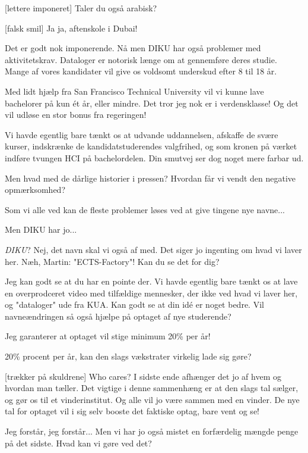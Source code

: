 \documentclass[a4paper,11pt]{article}
\begin{document}
\begin{sketch}
[lettere imponeret] Taler du også arabisk?

[falsk smil] Ja ja, aftenskole i Dubai! 

 Det er godt nok imponerende. Nå men DIKU har også problemer
med aktivitetskrav. Dataloger er notorisk længe om at gennemføre deres
studie. Mange af vores kandidater vil give os voldsomt underskud efter
8 til 18 år.

 Med lidt hjælp fra San Francisco Technical University vil vi
kunne lave bachelorer på kun ét år, eller mindre. Det tror jeg nok er
i verdensklasse! Og det vil udløse en stor bonus fra regeringen!

 Vi havde egentlig bare tænkt os at udvande uddannelsen,
afskaffe de svære kurser, indskrænke de kandidatstuderendes
valgfrihed, og som kronen på værket indføre tvungen HCI på
bachelordelen. Din smutvej ser dog noget mere farbar ud.

Men hvad med de dårlige historier i pressen? Hvordan får vi vendt den
negative opmærksomhed?

 Som vi alle ved kan de fleste problemer løses ved at give
tingene nye navne...

 Men DIKU har jo...

 \textit{DIKU}? Nej, det navn skal vi også af med. Det siger
jo ingenting om hvad vi laver her. Næh, Martin: "ECTS-Factory"! Kan du
se det for dig?

 Jeg kan godt se at du har en pointe der. Vi havde egentlig
bare tænkt os at lave en overprodceret video med tilfældige mennesker,
der ikke ved hvad vi laver her, og "dataloger"  ude fra KUA. Kan godt se at din idé er
noget bedre. Vil navneændringen så også hjælpe på optaget af nye
studerende?

 Jeg garanterer at optaget vil stige minimum 20\% per år!

 20\% procent per år, kan den slags vækstrater virkelig lade
sig gøre?

[trækker på skuldrene] Who cares? I sidste ende afhænger det
jo af hvem og hvordan man tæller. Det vigtige i denne sammenhæng er at
den slags tal sælger, og gør os til et vinderinstitut. Og alle vil jo
være sammen med en vinder. De nye tal for optaget vil i sig selv
booste det faktiske optag, bare vent og se!

 Jeg forstår, jeg forstår... Men vi har jo også mistet en
forfærdelig mængde penge på det sidste. Hvad kan vi gøre ved det?


\end{sketch}
\end{document}
